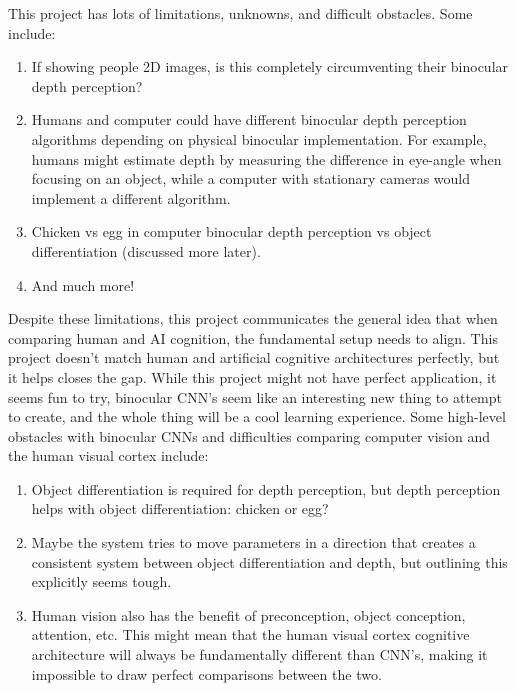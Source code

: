 \documentclass{article}
\begin{document}
\indent This project has lots of limitations, unknowns, and difficult obstacles. Some include:
\begin{enumerate}
    \item If showing people 2D images, is this completely circumventing their binocular depth perception?
    \item Humans and computer could have different binocular depth perception algorithms depending on physical binocular implementation. For example, humans might estimate depth by measuring the difference in eye-angle when focusing on an object, while a computer with stationary cameras would implement a different algorithm. 
    \item Chicken vs egg in computer binocular depth perception vs object differentiation (discussed more later).
    \item And much more! 
\end{enumerate}
Despite these limitations, this project communicates the general idea that when comparing human and AI cognition, the fundamental setup needs to align. This project doesn't match human and artificial cognitive architectures perfectly, but it helps closes the gap. While this project might not have perfect application, it seems fun to try, binocular CNN's seem like an interesting new thing to attempt to create, and the whole thing will be a cool learning experience. \newline \newline
Some high-level obstacles with binocular CNNs and difficulties comparing computer vision and the human visual cortex include:
\begin{enumerate}
    \item Object differentiation is required for depth perception, but depth perception helps with object differentiation: chicken or egg?
    \item  Maybe the system tries to move parameters in a direction that creates a consistent system between object differentiation and depth, but outlining this explicitly seems tough.
    \item Human vision also has the benefit of preconception, object conception, attention, etc. This might mean that the human visual cortex cognitive architecture will always be fundamentally different than CNN's, making it impossible to draw perfect comparisons between the two. 
\end{enumerate}
\end{document}
